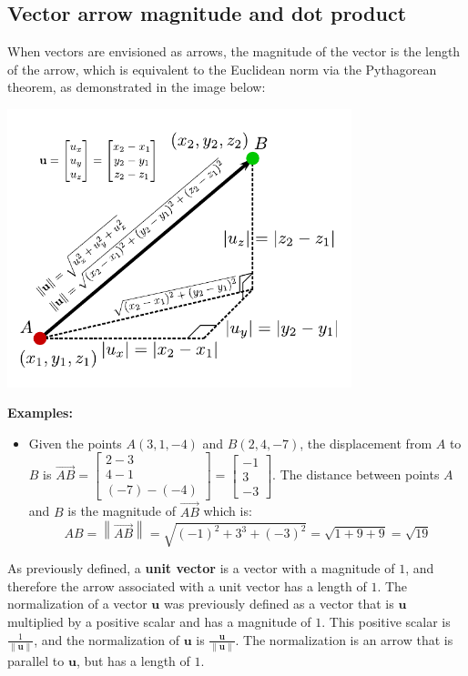 \documentclass{article}
\begin{document}
\subsection*{Vector arrow magnitude and dot product}

When vectors are envisioned as arrows, the magnitude of the vector is the length of the arrow, which is equivalent to the Euclidean norm via the Pythagorean theorem, as demonstrated in the image below:

\begin{center}
\includegraphics[width = 0.75\textwidth]{displacement_vector_magnitude}
\end{center}

\textbf{Examples:}
\begin{itemize}
\item Given the points \(A(3, 1, -4)\) and \(B(2, 4, -7)\), the displacement from \(A\) to \(B\) is \(\overrightarrow{AB} = \begin{bmatrix} 2 - 3 \\ 4 - 1 \\ (-7) - (-4) \end{bmatrix} = \begin{bmatrix} -1 \\ 3 \\ -3 \end{bmatrix}\). The distance between points \(A\) and \(B\) is the magnitude of \(\overrightarrow{AB}\) which is:
\[AB = \left\|\overrightarrow{AB}\right\| = \sqrt{(-1)^2 + 3^3 + (-3)^2} = \sqrt{1 + 9 + 9} = \sqrt{19}\]
\end{itemize}

As previously defined, a {\bf unit vector} is a vector with a magnitude of \(1\), and therefore the arrow associated with a unit vector has a length of \(1\). The normalization of a vector \(\mathbf{u}\) was previously defined as a vector that is \(\mathbf{u}\) multiplied by a positive scalar and has a magnitude of \(1\). This positive scalar is \(\frac{1}{\|\mathbf{u}\|}\), and the normalization of \(\mathbf{u}\) is \(\frac{\mathbf{u}}{\|\mathbf{u}\|}\). The normalization is an arrow that is parallel to \(\mathbf{u}\), but has a length of \(1\).
\end{document}

